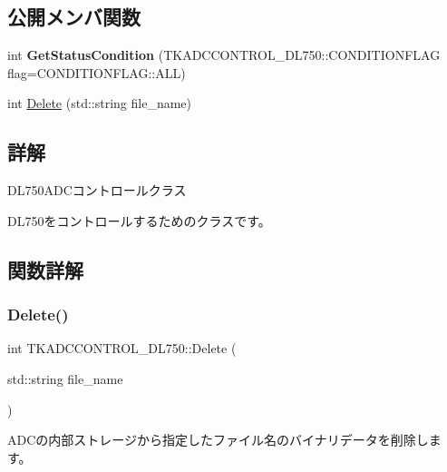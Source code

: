 \subsection*{公開メンバ関数}
\begin{DoxyCompactItemize}
\item 
\mbox{\label{class_t_k_a_d_c_c_o_n_t_r_o_l___d_l750_a446061dc1b932e53ca20d8ae449d788e}} 
int {\bfseries Get\+Status\+Condition} (T\+K\+A\+D\+C\+C\+O\+N\+T\+R\+O\+L\+\_\+\+D\+L750\+::\+C\+O\+N\+D\+I\+T\+I\+O\+N\+F\+L\+AG flag=C\+O\+N\+D\+I\+T\+I\+O\+N\+F\+L\+A\+G\+::\+A\+LL)
\item 
int \hyperlink{class_t_k_a_d_c_c_o_n_t_r_o_l___d_l750_a27ce5b790800ffee6d2daddeb0bf9e17}{Delete} (std\+::string file\+\_\+name)
\end{DoxyCompactItemize}


\subsection{詳解}
D\+L750\+A\+D\+Cコントロールクラス

D\+L750をコントロールするためのクラスです。 

\subsection{関数詳解}
\mbox{\label{class_t_k_a_d_c_c_o_n_t_r_o_l___d_l750_a27ce5b790800ffee6d2daddeb0bf9e17}} 
\subsubsection{\texorpdfstring{Delete()}{Delete()}}
{\footnotesize\ttfamily int T\+K\+A\+D\+C\+C\+O\+N\+T\+R\+O\+L\+\_\+\+D\+L750\+::\+Delete (\begin{DoxyParamCaption}\item[{std\+::string}]{file\+\_\+name }\end{DoxyParamCaption})\hspace{0.3cm}{\ttfamily [virtual]}}

A\+D\+Cの内部ストレージから指定したファイル名のバイナリデータを削除します。

